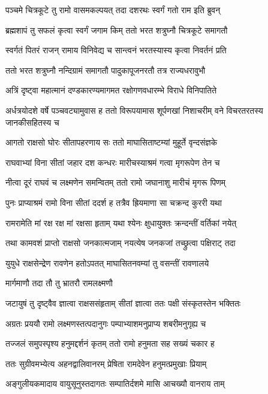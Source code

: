 \twolineshloka
{पञ्चमे चित्रकूटे तु रामो वासमकल्पयत्}
{तदा दशरथः स्वर्गं गतो राम इति ब्रुवन्}%

\twolineshloka
{ब्रह्मशापं तु सफलं कृत्वा स्वर्गं जगाम किम्}
{ततो भरत शत्रुघ्नौ चित्रकूटे समागतौ}%

\twolineshloka
{स्वर्गतं पितरं राजन् रामाय विनिवेद्य च}
{सान्त्वनं भरतस्यास्य कृत्वा निवर्तनं प्रति}%

\twolineshloka
{ततो भरत शत्रुघ्नौ नन्दिग्रामं समागतौ}
{पादुकापूजनरतौ तत्र राज्यधरावुभौ}%

\twolineshloka
{अत्रिं दृष्ट्वा महात्मानं दण्डकारण्यमागमत}
{रक्षोगणवधारम्भे विराधे विनिपातिते}%

\threelineshloka
{अर्धत्रयोदशे वर्षे पञ्चवट्यामुवास ह}
{ततो विरूपयामास शूर्पणखां निशाचरीम्}
{वने विचरतरतस्य जानकीसहितस्य च}%

\twolineshloka
{आगतो राक्षसो घोरः सीतापहरणाय सः}
{ततो माघासिताष्टम्यां मुहूर्ते वृन्दसंज्ञके}%

\twolineshloka
{राघवाभ्यां विना सीतां जहार दश कन्धरः}
{मारीचस्याश्रमं गत्वा मृगरूपेण तेन च}%

\twolineshloka
{नीत्वा दूरं राघवं च लक्ष्मणेन समन्वितम्}
{ततो रामो जघानाशु मारीचं मृगरू पिणम्}%

\twolineshloka
{पुनः प्राप्याश्रमं रामो विना सीतां ददर्श ह}
{तत्रैव ह्रियमाणा सा चक्रन्द कुररी यथा}%

\twolineshloka
{रामरामेति मां रक्ष रक्ष मां रक्षसा हृताम्}
{यथा श्येनः क्षुधायु्क्तः क्रन्दन्तीं वर्तिकां नयेत्}%

\twolineshloka
{तथा कामवशं प्राप्तो राक्षसो जनकात्मजाम्}
{नयत्येष जनकजां तच्छ्रुत्वा पक्षिराट् तदा}%

\twolineshloka
{युयुधे राक्षसेन्द्रेण रावणेन हतोऽपतत्}
{माघासितनवम्यां तु वसन्तीं रावणालये}%

\onelineshloka
{मार्गमाणौ तदा तौ तु भ्रातरौ रामलक्ष्मणौ}%

\twolineshloka
{जटायुषं तु दृष्ट्वैव ज्ञात्वा राक्षससंहृताम्}
{सीतां ज्ञात्वा ततः पक्षी संस्कृतस्तेन भक्तितः}%

\twolineshloka
{अग्रतः प्रययौ रामो लक्ष्मणस्तत्पदानुगः}
{पम्पाभ्याशमनुप्राप्य शबरीमनुगृह्य च}%

\twolineshloka
{तज्जलं समुपस्पृश्य हनुमद्दर्शनं कृतम्}
{ततो रामो हनुमता सह सख्यं चकार ह}%

\twolineshloka
{ततः सुग्रीवमभ्येत्य अहनद्वालिवानरम्}
{प्रेषिता रामदेवेन हनुमत्प्रमुखाः प्रियाम्}%

\twolineshloka
{अङ्गुलीयकमादाय वायुसूनुस्तदागतः}
{सम्पातिर्दशमे मासि आचख्यौ वानराय ताम्}%

